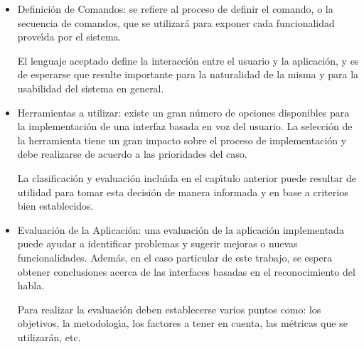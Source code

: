 \begin{itemize}
    \item Definici\'on de Comandos: se refiere al proceso de definir el comando, o la secuencia de
    comandos, que se utilizar\'a para exponer cada funcionalidad prove{\'\i}da por el sistema.

    El lenguaje aceptado define la interacci\'on entre el usuario y la aplicaci\'on, y es de esperarse
    que resulte importante para la naturalidad de la misma y para la usabilidad del sistema en
    general.

    \item Herramientas a utilizar: existe un gran n\'umero de opciones disponibles
    para la implementaci\'on de una interfaz basada en voz del usuario.
    La selecci\'on de la herramienta tiene un gran impacto sobre el proceso de implementaci\'on
    y debe realizarse de acuerdo a las prioridades del caso.

    La clasificaci\'on y evaluaci\'on inclu{\'\i}da en el cap{\'\i}tulo anterior puede resultar de
    utilidad para tomar esta decisi\'on de manera informada y en base a criterios bien establecidos.

    \item Evaluaci\'on de la Aplicaci\'on: una evaluaci\'on de la aplicaci\'on implementada puede ayudar
    a identificar problemas y sugerir mejoras o nuevas funcionalidades. Adem\'as, en el caso particular
    de este trabajo, se espera obtener conclusiones acerca de las interfaces basadas en el reconocimiento
    del habla.

    Para realizar la evaluaci\'on deben establecerse varios puntos como: los objetivos, la metodolog{\'\i}a,
    los factores a tener en cuenta, las m\'etricas que se utilizar\'an, etc.

 \end{itemize} 